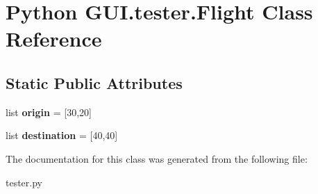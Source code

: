 \hypertarget{class_python_01_g_u_i_1_1tester_1_1_flight}{}\section{Python G\+U\+I.\+tester.\+Flight Class Reference}
\label{class_python_01_g_u_i_1_1tester_1_1_flight}
\subsection*{Static Public Attributes}
\begin{DoxyCompactItemize}
\item 
\mbox{\label{class_python_01_g_u_i_1_1tester_1_1_flight_ad0cadbbac9db7fa1ee12ee1e57870820}} 
list {\bfseries origin} = \mbox{[}30,20\mbox{]}
\item 
\mbox{\label{class_python_01_g_u_i_1_1tester_1_1_flight_adf71daf248a4224c2b1d911fc4b7255c}} 
list {\bfseries destination} = \mbox{[}40,40\mbox{]}
\end{DoxyCompactItemize}


The documentation for this class was generated from the following file\+:\begin{DoxyCompactItemize}
\item 
tester.\+py\end{DoxyCompactItemize}
